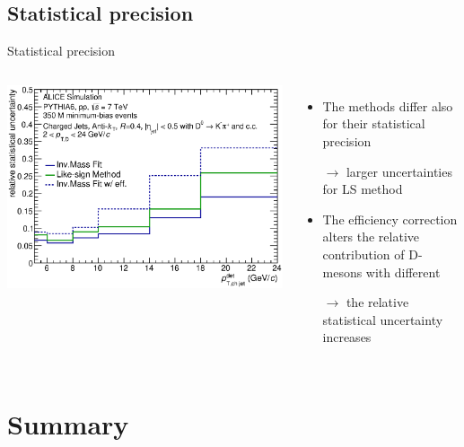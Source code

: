 \documentclass{beamer}
\begin{document}
\subsection{Statistical precision}
\begin{frame}{Statistical precision}
\begin{columns}
\includegraphics[width=\textwidth]{img/HQ16_Simulation_UncertaintyComparison}

\begin{itemize}
\item The methods differ also for their \alert{statistical precision}
\item[$\rightarrow$] larger uncertainties for LS method
\item The \alert{efficiency correction} alters the relative contribution of D-mesons with different \pt
\item[$\rightarrow$] the relative statistical uncertainty increases
\end{itemize}
\end{columns}
\end{frame}

\section*{Summary}
\end{document}
